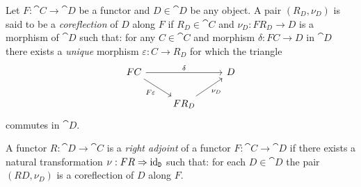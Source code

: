 \begin{definition}[Coreflection]
    \label{def:coreflection-along-functor}
    Let \(F: \cat C \to \cat D\) be a functor and \(D \in \cat D\) be any object. A pair
    \((R_D, \nu_D)\) is said to be a \emph{coreflection} of \(D\) along \(F\) if \(R_D
    \in \cat C\) and \(\nu_D: F R_D \to D\) is a morphism of \(\cat D\) such that: for any
    \(C \in \cat C\) and morphism \(\delta: F C \to D\) in \(\cat D\) there exists a
    \emph{unique} morphism \(\varepsilon: C \to R_D\) for which the triangle
    \[
        \begin{tikzcd}
            F C \ar[rr, "\delta"] \ar[rd, "F \varepsilon"']
            & &D
            \\
            &F R_D
            \ar[ru, "\nu_D"']
            &
        \end{tikzcd}
    \]
    commutes in \(\cat D\).
\end{definition}

\begin{definition}
    \label{def:right-adjoint}
    A functor \(R: \cat D \to \cat C\) is a \emph{right adjoint} of a functor
    \(F: \cat C \to \cat D\) if there exists a natural transformation
    \(\nu: F R \Rightarrow \operatorname{id}_{\texttt D}\) such that: for each \(D \in \cat D\) the pair
    \((R D, \nu_D)\) is a coreflection of \(D\) along \(F\).
\end{definition}

